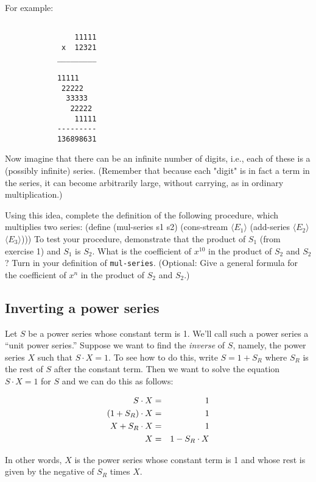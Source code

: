 For example:

\begin{verbatim}

                11111
             x  12321
            _________

            11111
             22222
              33333
               22222
                11111
            ---------
            136898631

\end{verbatim}

Now imagine that there can be an infinite number of digits, i.e., each of
these is a (possibly infinite) series.  (Remember that because each "digit"
is in fact a term in the series, it can become arbitrarily large, without
carrying, as in ordinary multiplication.)

Using this idea, complete the definition of the following procedure,
which multiplies two series:
\beginlisp
(define (mul-series s1 s2)
  (cons-stream $\langle E_1 \rangle$
               (add-series $\langle E_2 \rangle$
                           $\langle E_3 \rangle$)))
\endlisp
To test your procedure, demonstrate that the product of $S_1$ (from
exercise 1) and $S_1$ is $S_2$.  What is the coefficient of
$x^{10}$ in the product of $S_2$ and $S_2$?  Turn in your definition of
{\tt mul-series}.  (Optional: Give a general formula for the
coefficient of $x^n$ in the product of $S_2$ and $S_2$.)

\subsection*{Inverting a power series}

Let $S$ be a power series whose constant term is 1.  We'll call such a
power series a ``unit power series.''  Suppose we want to find the {\em
inverse} of $S$, namely, the power series $X$ such that $S\cdot X= 1$.
To see how to do this,
write $S=1+S_R$ where $S_R$ is the rest of $S$ after the constant
term.  Then we want to solve the equation $S \cdot X = 1$ for $S$ and
we can do this as follows:

\begin{eqnarray*}
S \cdot X &=& 1 \cr
(1+S_R)\cdot X &=& 1 \cr
X + S_R \cdot X &=& 1 \cr
X &=& 1 - S_R \cdot X
\end{eqnarray*}

In other words, $X$ is the power series whose constant term is 1 and
whose rest is given by the negative of $S_R$ times $X$.


